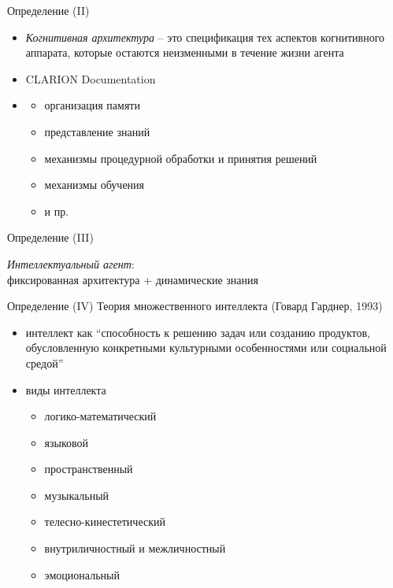\documentclass{beamer}
\begin{document}
\begin{frame}{Определение (II)}
\begin{itemize}
    \item[] \textit{Когнитивная архитектура} -- это спецификация тех аспектов когнитивного аппарата, которые остаются неизменными в течение жизни агента
    \item[] \hfill {\small CLARION Documentation}
    \bigskip
    \item[]
        \begin{itemize}
            \item организация памяти
            \item представление знаний
            \item механизмы процедурной обработки и принятия решений
            \item механизмы обучения
            \item и пр.
        \end{itemize}
\end{itemize}
\end{frame}

\begin{frame}{Определение (III)}
\begin{center}
\textit{Интеллектуальный агент}:\\фиксированная архитектура + динамические знания
\end{center}
\end{frame}

\begin{frame}{Определение (IV)}
Теория множественного интеллекта (Говард Гарднер, 1993)\\
\bigskip
\begin{itemize}
    \item интеллект как ``способность к решению задач или созданию продуктов, обусловленную конкретными культурными особенностями или социальной средой''
    \medskip
    \item виды интеллекта
        \medskip
        \begin{itemize}
           \item логико-математический
           \item языковой
           \item пространственный
           \item музыкальный
           \item телесно-кинестетический
           \item внутриличностный и межличностный
           \item эмоциональный
        \end{itemize}
\end{itemize}
\end{frame}
\end{document}
